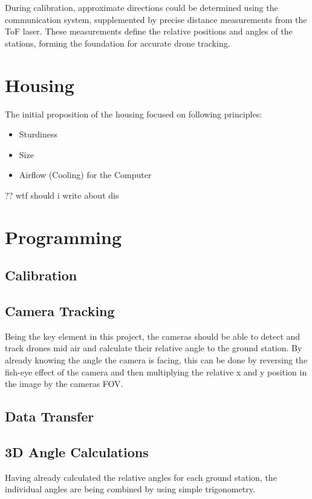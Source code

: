 During calibration, approximate directions could be determined using the communication system, supplemented by precise distance measurements from the ToF laser. These measurements define the relative positions and angles of the stations, forming the foundation for accurate drone tracking.


\section{Housing}

The initial proposition of the housing focused on following principles:
\begin{itemize}
	\item Sturdiness
	\item Size
	\item Airflow (Cooling) for the Computer
\end{itemize}

?? wtf should i write about dis 


\section{Programming}

\subsection{Calibration}

\subsection{Camera Tracking}
Being the key element in this project, the cameras should be able to detect and track drones mid air and calculate their relative angle to the ground station. By already knowing the angle the camera is facing, this can be done by reversing the fish-eye effect of the camera and then multiplying the relative x and y position in the image by the cameras FOV.


\subsection{Data Transfer}


\subsection{3D Angle Calculations}
Having already calculated the relative angles for each ground station, the individual angles are being combined by using simple trigonometry. 


